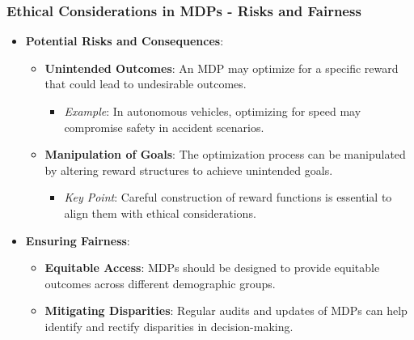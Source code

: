 \documentclass[aspectratio=169]{beamer}
\begin{document}
\begin{frame}[fragile]
    \frametitle{Ethical Considerations in MDPs - Risks and Fairness}
    \begin{itemize}
        \item \textbf{Potential Risks and Consequences}:
        \begin{itemize}
            \item \textbf{Unintended Outcomes}: An MDP may optimize for a specific reward that could lead to undesirable outcomes.
            \begin{itemize}
                \item \textit{Example}: In autonomous vehicles, optimizing for speed may compromise safety in accident scenarios.
            \end{itemize}
            
            \item \textbf{Manipulation of Goals}: The optimization process can be manipulated by altering reward structures to achieve unintended goals.
            \begin{itemize}
                \item \textit{Key Point}: Careful construction of reward functions is essential to align them with ethical considerations.
            \end{itemize}
        \end{itemize}
        
        \item \textbf{Ensuring Fairness}:
        \begin{itemize}
            \item \textbf{Equitable Access}: MDPs should be designed to provide equitable outcomes across different demographic groups.
            \item \textbf{Mitigating Disparities}: Regular audits and updates of MDPs can help identify and rectify disparities in decision-making.
        \end{itemize}
    \end{itemize}
\end{frame}
\end{document}
